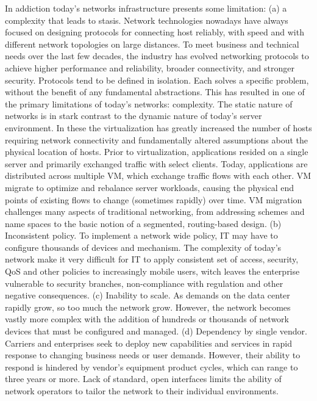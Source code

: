 In addiction today's networks infrastructure presents some limitation: (a) a complexity that leads to stasis. Network technologies nowadays have always focused on designing protocols for connecting host reliably, with speed and with different network topologies on large distances. To meet business and technical needs over the last few decades, the industry has evolved networking protocols to achieve higher performance and reliability, broader connectivity, and stronger security. Protocols tend to be defined in isolation. Each solves a specific problem, without the benefit of any fundamental abstractions. This has resulted in one of the primary limitations of today's networks: complexity. The static nature of networks is in stark contrast to the dynamic nature of today's server environment. In these the virtualization has greatly increased the number of hosts requiring network connectivity and fundamentally altered assumptions about the physical location of hosts. Prior to virtualization, applications resided on a single server and primarily exchanged traffic with select clients. Today, applications are distributed across multiple \ac{VM}, which exchange traffic flows with each other. \ac{VM} migrate to optimize and rebalance server workloads, causing the physical end points of existing flows to change (sometimes rapidly) over time. \ac{VM} migration challenges many aspects of traditional networking, from addressing schemes and name spaces to the basic notion of a segmented, routing-based design. (b) Inconsistent policy. To implement a network wide policy, \ac{IT} may have to configure thousands of devices and mechanism. The complexity of today's network make it very difficult for \ac{IT} to apply consistent set of access, security, \ac{QoS} and other policies to increasingly mobile users, witch leaves the enterprise vulnerable to security branches, non-compliance with regulation and other negative consequences. (c) Inability to scale. As demands on the data center rapidly grow, so too much the network grow. However, the network becomes vastly more complex with the addition of hundreds or thousands of network devices that must be configured and managed. (d) Dependency by single vendor. Carriers and enterprises seek to deploy new capabilities and services in rapid response to changing business needs or user demands. However, their ability to respond is hindered by vendor's equipment product cycles, which can range to three years or more. Lack of standard, open interfaces limits the ability of network operators to tailor the network to their individual environments. \cite{onf:sdn-description-limitations}

